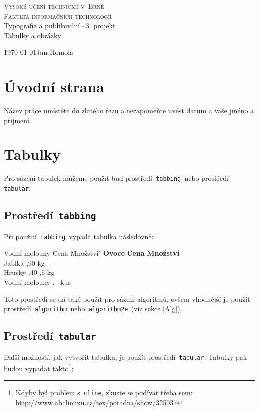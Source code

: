 \documentclass[a4paper, 11pt]{article}
\begin{document}
\begin{titlepage}
    \begin{center}
        \textsc{{\Huge Vysoké učení technické v~Brně}\\[0.4em]
                {\huge Fakulta informačních technologií}}\\
        {\LARGE Typografie a publikování\,--\,3. projekt}\\[0.3em]
        {\Huge Tabulky a obrázky}
    \end{center}
{\Large \today \hfill Ján Homola}
\end{titlepage}

\section{Úvodní strana}
Název práce umístěte do zlatého řezu a nezapomeňte uvést  datum a vaše jméno a příjmení.

\section{Tabulky}
Pro sázení tabulek můžeme použıt buď prostředí\texttt{ tabbing }nebo prostředí\texttt{ tabular}.

\subsection{Prostředí\texttt{ tabbing}}
Při použití\texttt{ tabbing }vypadá tabulka následovně:

\begin{tabbing}
    Vodní molouny \quad \= Cena \quad \= Množství \= \kill
    \textbf{Ovoce} \> \textbf{Cena} \> \textbf{Množství} \\
    Jablka ,90  kg \\
    Hrušky ,40 ,5 kg \\
    Vodní molouny ,--  kus
\end{tabbing}
\bigskip

\noindent Toto prostředí se dá také použít pro sázení algoritmů, ovšem vhodnější je použít
prostředí\texttt{ algorithm }nebo\texttt{ algorithm2e }(viz sekce \ref{Alg}).

\subsection{Prostředí\texttt{ tabular}}
Další možností, jak vytvořit tabulku, je použít prostředí\texttt{ tabular}. Tabulky pak
budou vypadat takto\footnote{Kdyby byl problem s\texttt{ cline}, zkuste se podívat třeba sem:
http://www.abclinuxu.cz/tex/poradna/show/325037}:
\bigskip
\end{document}
